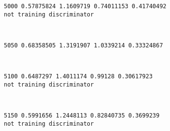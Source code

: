 \documentclass[11pt]{article}
\begin{document}
    \begin{Verbatim}[commandchars=\\\{\}]
5000 0.57875824 1.1609719 0.74011153 0.41740492
not training discriminator

    \end{Verbatim}

    \begin{center}
    \end{center}
    { \hspace*{\fill} \\}
    
    \begin{Verbatim}[commandchars=\\\{\}]
5050 0.68358505 1.3191907 1.0339214 0.33324867

    \end{Verbatim}

    \begin{center}
    \end{center}
    { \hspace*{\fill} \\}
    
    \begin{Verbatim}[commandchars=\\\{\}]
5100 0.6487297 1.4011174 0.99128 0.30617923
not training discriminator

    \end{Verbatim}

    \begin{center}
    \end{center}
    { \hspace*{\fill} \\}
    
    \begin{Verbatim}[commandchars=\\\{\}]
5150 0.5991656 1.2448113 0.82840735 0.3699239
not training discriminator

    \end{Verbatim}

    \begin{center}
    \end{center}
    { \hspace*{\fill} \\}
    
\end{document}
